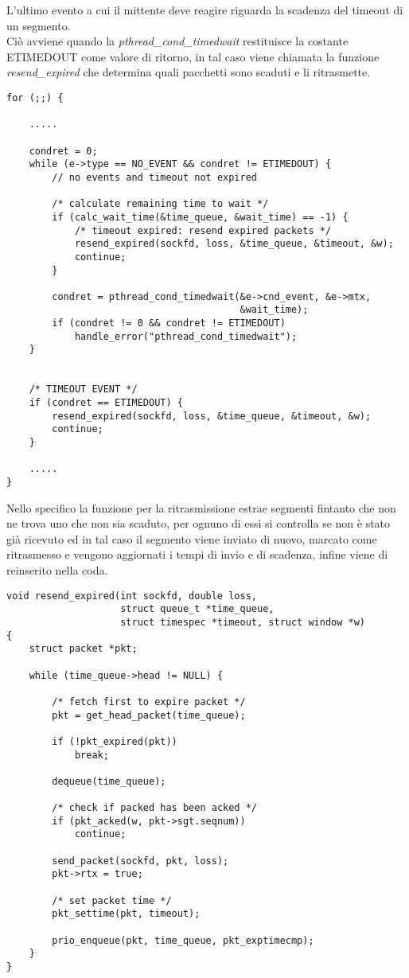 L'ultimo evento a cui il mittente deve reagire riguarda la scadenza del 
timeout di un segmento.\\
Ciò avviene quando la \emph{pthread\_cond\_timedwait} restituisce la 
costante ETIMEDOUT come valore di ritorno, in tal caso viene chiamata
la funzione \emph{resend\_expired} che determina quali pacchetti sono 
scaduti e li ritrasmette.
\begin{lstlisting}[title=window.c]
for (;;) {

    .....

	condret = 0;
	while (e->type == NO_EVENT && condret != ETIMEDOUT) {
		// no events and timeout not expired

		/* calculate remaining time to wait */
		if (calc_wait_time(&time_queue, &wait_time) == -1) {
			/* timeout expired: resend expired packets */
			resend_expired(sockfd, loss, &time_queue, &timeout, &w);
			continue;
		}

		condret = pthread_cond_timedwait(&e->cnd_event, &e->mtx,
                                         &wait_time);
		if (condret != 0 && condret != ETIMEDOUT)
			handle_error("pthread_cond_timedwait");
	}


	/* TIMEOUT EVENT */
	if (condret == ETIMEDOUT) {
		resend_expired(sockfd, loss, &time_queue, &timeout, &w);
		continue;
	}

    .....
}
\end{lstlisting}
Nello specifico la funzione per la ritrasmissione estrae segmenti fintanto
che non ne trova uno che non sia scaduto, per ognuno di essi si controlla 
se non è stato già ricevuto ed in tal caso il segmento viene inviato di
nuovo, marcato come ritrasmesso e vengono aggiornati i tempi di invio e di
scadenza, infine viene di reinserito nella coda.
\begin{lstlisting}[title=transport.c]
void resend_expired(int sockfd, double loss, 
                    struct queue_t *time_queue,
                    struct timespec *timeout, struct window *w)
{
    struct packet *pkt;

    while (time_queue->head != NULL) {

        /* fetch first to expire packet */
        pkt = get_head_packet(time_queue);

        if (!pkt_expired(pkt))
            break;

        dequeue(time_queue);

        /* check if packed has been acked */
        if (pkt_acked(w, pkt->sgt.seqnum))
            continue;

        send_packet(sockfd, pkt, loss);
        pkt->rtx = true;

        /* set packet time */
        pkt_settime(pkt, timeout);

        prio_enqueue(pkt, time_queue, pkt_exptimecmp);
    }
}
\end{lstlisting}
